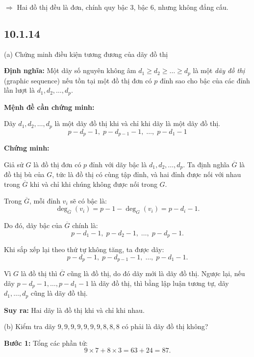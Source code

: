 \documentclass{article}
\begin{document}
		$\Rightarrow$  Hai đồ thị đều là đơn, chính quy bậc 3, bậc 6, nhưng không đẳng cấu.
	
	\subsection*{10.1.14}
	(a) Chứng minh điều kiện tương đương của dãy đồ thị
	
	\textbf{Định nghĩa:} Một dãy số nguyên không âm \( d_1 \ge d_2 \ge \dots \ge d_p \) là một \textit{dãy đồ thị} (graphic sequence) nếu tồn tại một đồ thị đơn có \( p \) đỉnh sao cho bậc của các đỉnh lần lượt là \( d_1, d_2, \dots, d_p \).
	
	\bigskip
	
	\textbf{Mệnh đề cần chứng minh:}
	
	Dãy \( d_1, d_2, \dots, d_p \) là một dãy đồ thị khi và chỉ khi dãy là một dãy đồ thị.
	\[
	p - d_p - 1,\; p - d_{p-1} - 1,\; \dots,\; p - d_1 - 1
	\]
	
	
	\bigskip
	
	\textbf{Chứng minh:}
	
	Giả sử \( G \) là đồ thị đơn có \( p \) đỉnh với dãy bậc là \( d_1, d_2, \dots, d_p \). Ta định nghĩa \( \overline{G} \) là đồ thị bù của \( G \), tức là đồ thị có cùng tập đỉnh, và hai đỉnh được nối với nhau trong \( \overline{G} \) khi và chỉ khi chúng không được nối trong \( G \).
	
	Trong \( \overline{G} \), mỗi đỉnh \( v_i \) sẽ có bậc là:
	\[
	\deg_{\overline{G}}(v_i) = p - 1 - \deg_G(v_i) = p - d_i - 1.
	\]
	
	Do đó, dãy bậc của \( \overline{G} \) chính là:
	\[
	p - d_1 - 1,\; p - d_2 - 1,\; \dots,\; p - d_p - 1.
	\]
	
	Khi sắp xếp lại theo thứ tự không tăng, ta được dãy:
	\[
	p - d_p - 1,\; p - d_{p-1} - 1,\; \dots,\; p - d_1 - 1.
	\]
	
	Vì \( G \) là đồ thị thì \( \overline{G} \) cũng là đồ thị, do đó dãy mới là dãy đồ thị. Ngược lại, nếu dãy \( p - d_p - 1,\dots, p - d_1 - 1 \) là dãy đồ thị, thì bằng lập luận tương tự, dãy \( d_1, \dots, d_p \) cũng là dãy đồ thị. 
	
	\textbf{Suy ra:} Hai dãy là đồ thị khi và chỉ khi nhau.
	
	
	
	(b) Kiểm tra dãy \( 9,9,9,9,9,9,9,8,8,8 \) có phải là dãy đồ thị không?
	
	\textbf{Bước 1:} Tổng các phần tử:
	\[
	9 \times 7 + 8 \times 3 = 63 + 24 = 87.
	\]
	
\end{document}
